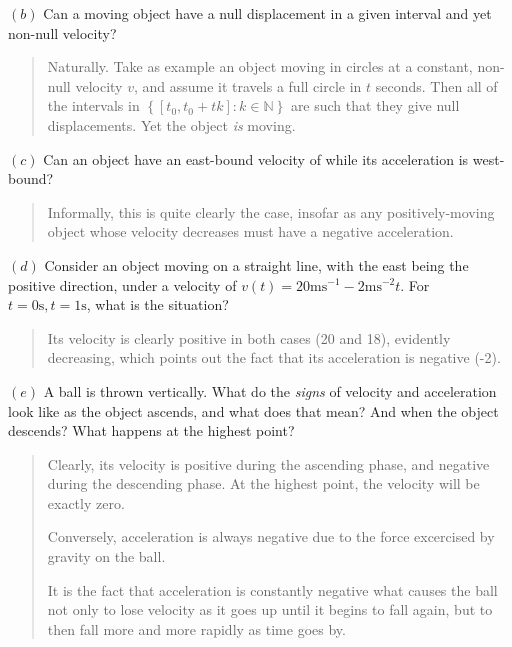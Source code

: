\documentclass[12pt]{article}
\theoremstyle{definition}
\begin{document}
$(b)$ Can a moving object have a null displacement in a given interval and yet
non-null velocity?


\small
\begin{quote}

Naturally. Take as example an object moving in circles at a constant, non-null
velocity $v$, and assume it travels a full circle in $t$ seconds. Then all of
the intervals in $\left\{ [t_0, t_0 + tk] : k \in \mathbb{N} \right\} $ are such
that they give null displacements. Yet the object \textit{is} moving.

\end{quote}
\normalsize

$(c)$ Can an object have an east-bound velocity of while its acceleration is
west-bound?


\small
\begin{quote}

Informally, this is quite clearly the case, insofar as any positively-moving
object whose velocity decreases must have a negative acceleration.

\end{quote}
\normalsize

$(d)$ Consider an object moving on a straight line, with the east being the positive
direction, under a velocity of $v(t) = 20 \text{ms}^{-1} - 2 \text{ms}^{-2} t$.
For $t = 0\text{s}, t = 1\text{s}$, what is the situation?


\small
\begin{quote}

Its velocity is clearly positive in both cases (20 and 18), evidently
decreasing, which points out the fact that its acceleration is negative (-2).

\end{quote}
\normalsize

$(e)$ A ball is thrown vertically. What do the \textit{signs} of velocity and
acceleration look like as the object ascends, and what does that mean? And
when the object descends? What happens at the highest point?


\small
\begin{quote}

Clearly, its velocity is positive during the ascending phase, and negative
during the descending phase. At the highest point, the velocity will be exactly
zero. 

Conversely, acceleration is always negative due to the force excercised by
gravity on the ball. 

It is the fact that acceleration is constantly negative what causes the ball not
only to lose velocity as it goes up until it begins to fall again, but to then
fall more and more rapidly as time goes by.


\end{quote}
\normalsize
\end{document}
